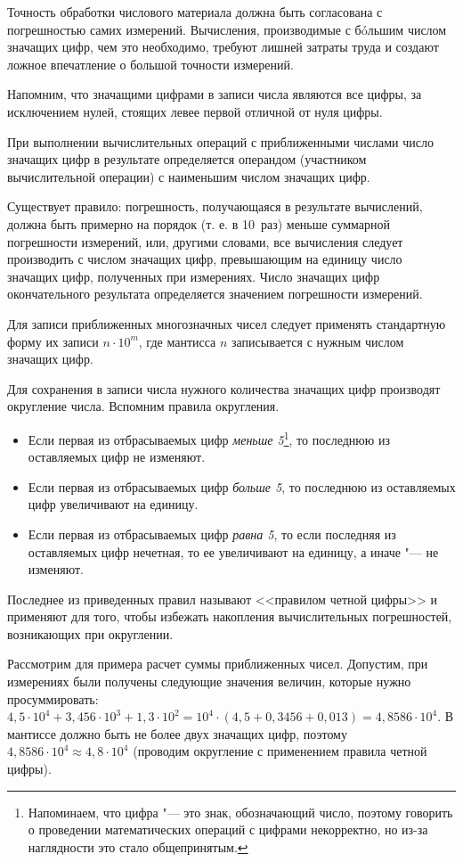 \documentclass[a4paper, 12pt]{extarticle}
\begin{document}
Точность обработки числового материала должна быть согласована с погрешностью самих измерений. Вычисления, производимые с б\'oльшим числом значащих цифр, чем это необходимо, требуют лишней затраты труда и создают ложное впечатление о большой точности измерений.

Напомним, что значащими цифрами в записи числа являются все цифры, за исключением нулей, стоящих левее первой отличной от нуля цифры.

При выполнении вычислительных операций с приближенными числами число значащих цифр в результате определяется операндом (участником вычислительной операции) с наименьшим числом значащих цифр.

Существует правило: погрешность, получающаяся в результате вычислений, должна быть примерно на порядок (т. е. в 10~раз) меньше суммарной погрешности измерений, или, другими словами, все вычисления следует производить с числом значащих цифр, превышающим на единицу число значащих цифр, полученных при измерениях. Число значащих цифр окончательного результата определяется значением погрешности измерений.

Для записи приближенных многозначных чисел следует применять стандартную форму их записи $n \cdot 10^m$, где мантисса $n$ записывается с нужным числом значащих цифр.

Для сохранения в записи числа нужного количества значащих цифр производят округление числа. Вспомним правила округления.

\begin{itemize}
  \item Если первая из отбрасываемых цифр \emph{меньше 5}\footnote{Напоминаем, что цифра "--- это знак, обозначающий число, поэтому говорить о проведении математических операций с цифрами некорректно, но из-за наглядности это стало общепринятым. }, то последнюю из оставляемых цифр не изменяют.
  \item Если первая из отбрасываемых цифр \emph{больше 5}, то последнюю из оставляемых цифр увеличивают на единицу.
  \item Если первая из отбрасываемых цифр \emph{равна 5}, то если последняя из оставляемых цифр нечетная, то ее увеличивают на единицу, а иначе "--- не изменяют.
\end{itemize}
Последнее из приведенных правил называют <<правилом четной цифры>> и применяют для того, чтобы избежать накопления вычислительных погрешностей, возникающих при округлении.

Рассмотрим для примера расчет суммы приближенных чисел. Допустим, при измерениях были получены следующие значения величин, которые нужно просуммировать: $4,5 \cdot 10^4 + 3,456 \cdot 10^3 + 1,3 \cdot 10^2 = 10^4 \cdot (4,5 + 0,3456 + 0,013) = 4,8586 \cdot 10^4$. В мантиссе должно быть не более двух значащих цифр, поэтому $4,8586 \cdot 10^4 \approx 4,8 \cdot 10^4$ (проводим округление с применением правила четной цифры).
\end{document}
